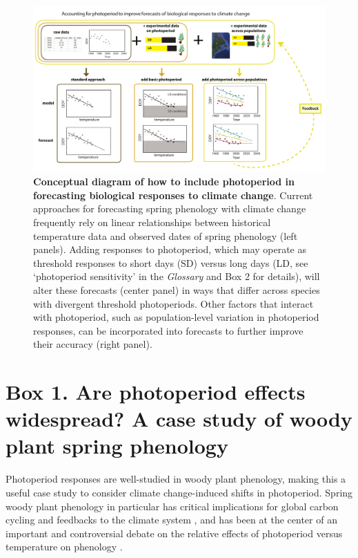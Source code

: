 \documentclass{article}
\begin{document}
\begin{figure}[h]
\includegraphics{..//..//analyses/photoperiod/figures/photocondiag6.pdf} 
\caption{\textbf{Conceptual diagram of how to include photoperiod in forecasting biological responses to climate change}. Current approaches for forecasting spring phenology with climate change frequently rely on linear relationships between historical temperature data and observed dates of spring phenology (left panels). Adding responses to photoperiod, which may operate as threshold responses to short days (SD) versus long days (LD, see `photoperiod sensitivity' in the \emph{Glossary} and Box 2 for details), will alter these forecasts (center panel) in ways that differ across species with divergent threshold photoperiods. Other factors that interact with photoperiod, such as population-level variation in photoperiod responses, can be incorporated into forecasts to further improve their accuracy (right panel).}
 \label{fig:condiag}
 \end{figure}
\clearpage

 
 \section*{Box 1. Are photoperiod effects widespread? A case study of woody plant spring phenology}
\par Photoperiod responses are well-studied in woody plant phenology, making this a useful case study to consider climate change-induced shifts in photoperiod. Spring woody plant phenology in particular has critical implications for global carbon cycling and feedbacks to the climate system \citep{richardson2013}, and has been at the center of an important and controversial debate on the relative effects of photoperiod versus temperature on phenology \citep[e.g.,][]{fu2019,chuine2010,koerner2010a,koerner2010b}. 
\end{document}

